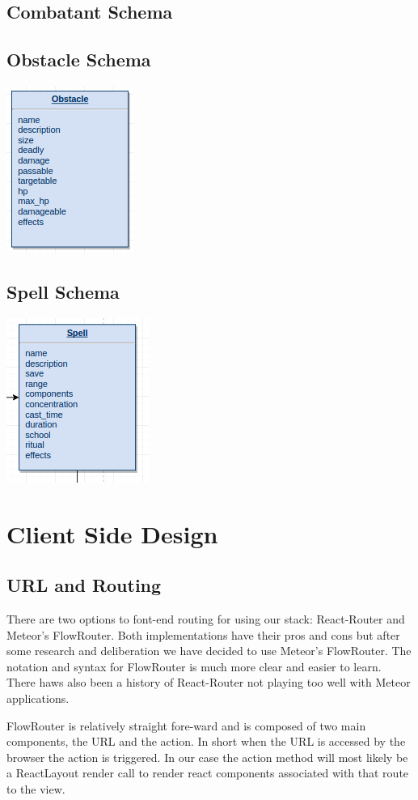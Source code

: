\documentclass[12pt,a4paper]{report}
\begin{document}
		\subsection{Combatant Schema}
		\subsection{Obstacle Schema}
			\includegraphics[scale=.75]{schema-obstacle}
		\subsection {Spell Schema}
			\includegraphics[scale=.75]{schema-spell}
\newpage
\section{Client Side Design}
	\subsection{URL and Routing}
		There are two options to font-end routing for using our stack: React-Router and Meteor's FlowRouter. Both implementations have their pros and cons but after some research and deliberation we have decided to use Meteor's FlowRouter. The notation and syntax for FlowRouter is much more clear and easier to learn. There haws also been a history of React-Router not playing too well with Meteor applications. 
		
		FlowRouter is relatively straight fore-ward and is composed of two main components, the URL and the action. In short when the URL is accessed by the browser the action is triggered. In our case the action method will most likely be a ReactLayout render call to render react components associated with that route to the view.
		
\end{document}
